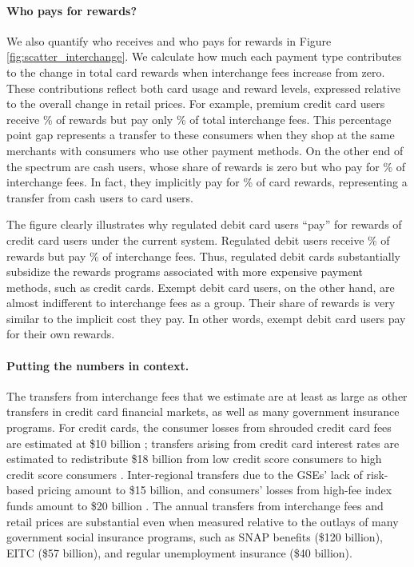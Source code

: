 \documentclass[main.tex]{subfiles}
\begin{document}
\paragraph{Who pays for rewards?} 
We also quantify who receives and who pays for rewards in Figure \ref{fig:scatter_interchange}.
We calculate how much each payment type contributes to the change in total card rewards when interchange fees increase from zero.
These contributions reflect both card usage and reward levels, expressed relative to the overall change in retail prices.
For example, premium credit card users receive \% of rewards but pay only \% of total interchange fees.
This  percentage point gap represents a transfer to these consumers when they shop at the same merchants with consumers who use other payment methods.
On the other end of the spectrum are cash users, whose share of rewards is zero but who pay for \% of interchange fees.
In fact, they implicitly pay for \% of card rewards, representing a transfer from cash users to card users.

The figure clearly illustrates why regulated debit card users ``pay'' for rewards of credit card users under the current system. Regulated debit users receive \% of rewards but pay \% of interchange fees.
Thus, regulated debit cards substantially subsidize the rewards programs associated with more expensive payment methods, such as credit cards.
Exempt debit card users, on the other hand, are almost indifferent to interchange fees as a group.
Their share of rewards is very similar to the implicit cost they pay.
In other words, exempt debit card users pay for their own rewards.

\paragraph{Putting the numbers in context.}

The transfers from interchange fees that we estimate are at least as large as other transfers in credit card financial markets, as well as many government insurance programs.
For credit cards, the consumer losses from shrouded credit card fees are estimated at \$10 billion \citep{agarwal2015regulating}; transfers arising from credit card interest rates are estimated to redistribute \$18 billion from low credit score consumers to high credit score consumers \citep{Agarwal.etal2025}.
Inter-regional transfers due to the GSEs' lack of risk-based pricing amount to \$15 billion, and consumers' losses from high-fee index funds amount to \$20 billion \citep{Hurst.etal2016}.
The annual transfers from interchange fees and retail prices are substantial even when measured relative to the outlays of many government social insurance programs, such as SNAP benefits (\$120 billion), EITC (\$57 billion), and regular unemployment insurance (\$40 billion).
\end{document}

